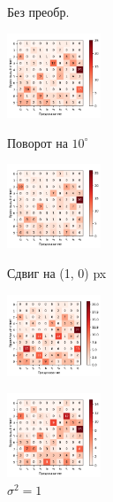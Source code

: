 \documentclass[a4paper, 11pt]{article}
\begin{document}
    \begin{figure}[!h]
        \begin{multicols}{4} 
            \caption{Без преобр.} \label{exp5:without}
            \includegraphics[width=0.25\textwidth]{../conf_matrix_experiment_4.pdf}
            \caption{Поворот на $10^{\circ}$} \label{exp5:rotate}
            \includegraphics[width=0.25\textwidth]{../conf_matrix_experiment_5_with_rotate_10.pdf}
            \caption{Сдвиг на (1, 0) px} \label{exp5:shift}
            \includegraphics[width=0.25\textwidth]{../conf_matrix_experiment_with_shift_0_1.pdf}
            \caption{$\sigma^2 = 1$} \label{exp5:blur}
            \includegraphics[width=0.25\textwidth]{../conf_matrix_experiment_with_blur_1.pdf}
        \end{multicols}
   \end{figure}
\end{document}
